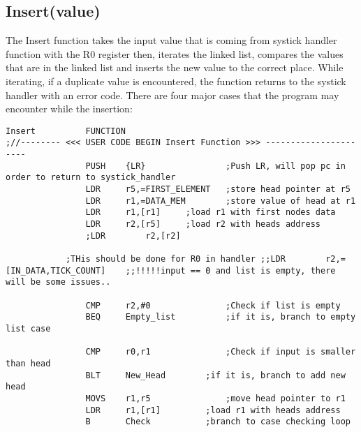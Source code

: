 \documentclass[pdftex,12pt,a4paper]{article}
\begin{document}
\subsection{Insert(value)}
\par The Insert function takes the input value that is coming from systick handler function with the R0 register then, iterates the linked list, compares the values that are in the linked list and inserts the new value to the correct place. While iterating, if a duplicate value is encountered, the function returns to the systick handler with an error code. There are four major cases that the program may encounter while the insertion:
\begin{lstlisting}[caption=Insert Function, style=customasm]
Insert			FUNCTION			
;//-------- <<< USER CODE BEGIN Insert Function >>> ----------------------					
				PUSH	{LR}				;Push LR, will pop pc in order to return to systick_handler
				LDR		r5,=FIRST_ELEMENT	;store head pointer at r5
				LDR 	r1,=DATA_MEM		;store value of head at r1
				LDR		r1,[r1]		;load r1 with first nodes data		
				LDR		r2,[r5]		;load r2 with heads address
				;LDR		r2,[r2]
			
			;THis should be done for R0 in handler ;;LDR		r2,=[IN_DATA,TICK_COUNT]	;;!!!!!input == 0 and list is empty, there will be some issues..
				
				CMP		r2,#0				;Check if list is empty
				BEQ		Empty_list			;if it is, branch to empty list case
				
				CMP 	r0,r1				;Check if input is smaller than head
				BLT		New_Head		;if it is, branch to add new head
				MOVS	r1,r5				;move head pointer to r1
				LDR		r1,[r1]			;load r1 with heads address
				B		Check			;branch to case checking loop
\end{lstlisting}
\newpage
\end{document}
